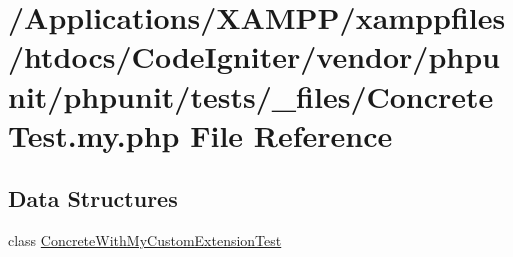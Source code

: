 \hypertarget{_concrete_test_8my_8php}{}\section{/\+Applications/\+X\+A\+M\+P\+P/xamppfiles/htdocs/\+Code\+Igniter/vendor/phpunit/phpunit/tests/\+\_\+files/\+Concrete\+Test.my.\+php File Reference}
\label{_concrete_test_8my_8php}
\subsection*{Data Structures}
\begin{DoxyCompactItemize}
\item 
class \mbox{\hyperlink{class_concrete_with_my_custom_extension_test}{Concrete\+With\+My\+Custom\+Extension\+Test}}
\end{DoxyCompactItemize}
